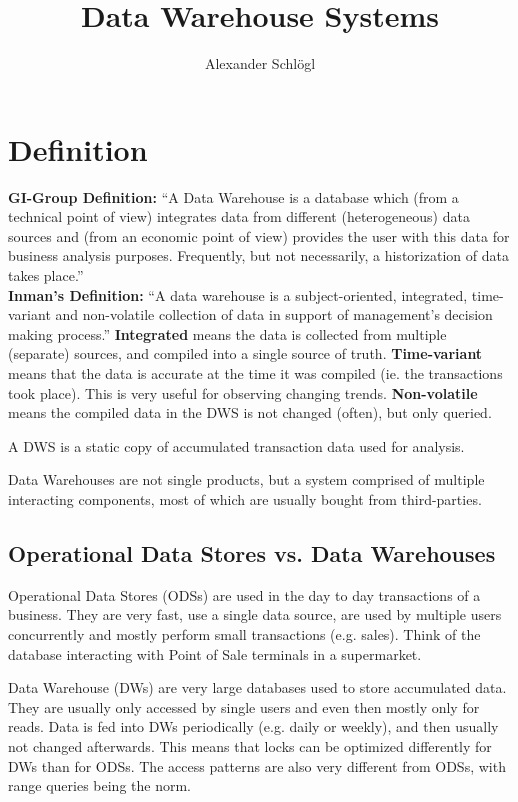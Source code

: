 \documentclass{article}
\title{Data Warehouse Systems}
\author{Alexander Schlögl}
\begin{document}
\maketitle
\section{Definition}
\textbf{GI-Group Definition:}
“A Data Warehouse is a database which (from a technical point of view) integrates data from different (heterogeneous) data sources and (from an economic point of view) provides the user with this data for business analysis purposes. Frequently, but not necessarily, a historization of data takes place.”
\\
\textbf{Inman's Definition:}
“A data warehouse is a subject-oriented, integrated, time-variant and non-volatile collection of data in support of management's decision making process.”
\textbf{Integrated} means the data is collected from multiple (separate) sources, and compiled into a single source of truth.
\textbf{Time-variant} means that the data is accurate at the time it was compiled (ie. the transactions took place).
This is very useful for observing changing trends.
\textbf{Non-volatile} means the compiled data in the DWS is not changed (often), but only queried.
\begin{keypointbox}
    A DWS is a static copy of accumulated transaction data used for analysis.
\end{keypointbox}

Data Warehouses are not single products, but a system comprised of multiple interacting components, most of which are usually bought from third-parties.

\subsection{Operational Data Stores vs. Data Warehouses}
Operational Data Stores (ODSs) are used in the day to day transactions of a business.
They are very fast, use a single data source, are used by multiple users concurrently and mostly perform small transactions (e.g. sales).
Think of the database interacting with Point of Sale terminals in a supermarket.

Data Warehouse (DWs) are very large databases used to store accumulated data.
They are usually only accessed by single users and even then mostly only for reads.
Data is fed into DWs periodically (e.g. daily or weekly), and then usually not changed afterwards.
This means that locks can be optimized differently for DWs than for ODSs.
The access patterns are also very different from ODSs, with range queries being the norm.
\end{document}
